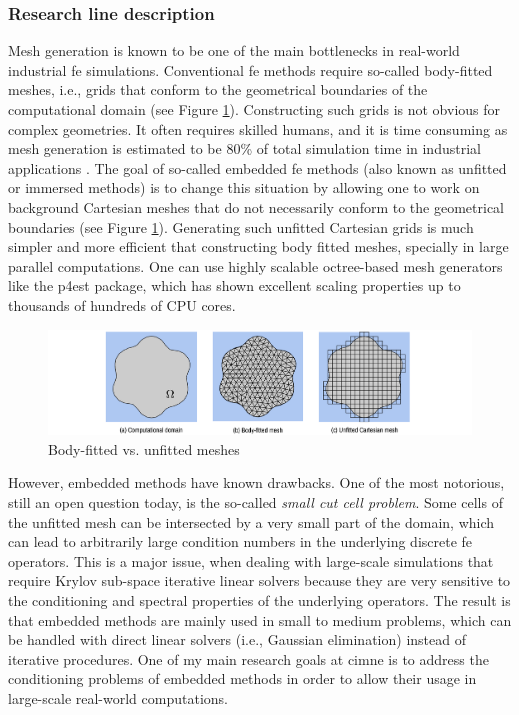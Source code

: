 \documentclass{article}
\newcommand{\bemph}[1]{#1}
\begin{document}
\subsubsection{Research line description}


Mesh generation is known to be one of the main bottlenecks in real-world industrial \ac{fe} simulations. Conventional \ac{fe} methods require so-called body-fitted meshes, i.e., grids that conform to the geometrical boundaries of the computational domain (see Figure \ref{fig:fitted-vs-unfitted}). Constructing such grids is not obvious for complex geometries. It often requires skilled humans, and it is time consuming as mesh generation is estimated to be 80\% of total simulation time in industrial applications \cite{Cottrell2009}. The goal of so-called embedded \ac{fe} methods \cite{burman_cutfem:_2015} (also known as unfitted or immersed methods) is to change this situation by allowing one to work on background Cartesian meshes that do not necessarily conform to the geometrical boundaries (see Figure \ref{fig:fitted-vs-unfitted}). Generating such unfitted Cartesian grids is much simpler and more efficient that constructing body fitted meshes, specially in large parallel computations.  One can use highly scalable octree-based mesh generators like the p4est package, which has shown excellent scaling properties up to thousands of hundreds of CPU cores. 

\begin{figure}[ht!]
\includegraphics[width=\textwidth]{../_assets/fig1.png}
\caption{Body-fitted vs. unfitted meshes}
\label{fig:fitted-vs-unfitted}
\end{figure}


However, embedded methods have known drawbacks. One of the most notorious, still an open question today, is the so-called \emph{small cut cell problem}. Some cells of the unfitted mesh can be intersected by a very small part of the domain, which can lead to arbitrarily large condition numbers in the underlying discrete \ac{fe} operators. This is a major issue, when dealing with large-scale simulations that require Krylov sub-space iterative linear solvers  because they are very sensitive to the conditioning and spectral properties of the underlying operators. The result is that embedded methods are mainly used in small to medium problems, which can be handled with direct linear solvers (i.e., Gaussian elimination) instead of iterative procedures. \bemph{One of my main research goals at \ac{cimne} is to address the conditioning problems of embedded methods in order to allow their usage in large-scale real-world computations}.
\end{document}
